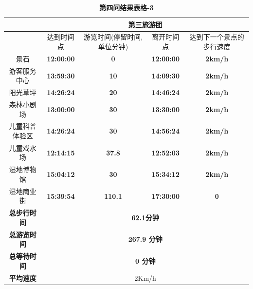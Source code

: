 \documentclass[hyperref,UTF8]{article}
\begin{document}
{\begin{table}[htbp]
  \centering
  \caption{\textbf{第四问结果表格-3}}
    \begin{tabular}{|c|c|c|c|c|}
    \hline
       & \multicolumn{4}{c|}{\textbf{第三旅游团}} \bigstrut\\
    \hline
       & \multicolumn{1}{p{4.055em}|}{达到时间点} & \multicolumn{1}{p{4.055em}|}{游览时间(停留时间,单位分钟)} & \multicolumn{1}{p{4.055em}|}{离开时间点} & \multicolumn{1}{p{4.055em}|}{达到下一个景点的步行速度} \bigstrut\\
    \hline
    \multicolumn{1}{|p{4.055em}|}{景石} & \textbf{12:00:00} & \textbf{0} & \textbf{12:00:00} & \multicolumn{1}{p{4.055em}|}{\textbf{2km/h}} \bigstrut\\
    \hline
    \multicolumn{1}{|p{4.055em}|}{游客服务中心} & \textbf{13:59:30} & \textbf{10} & \textbf{14:09:30} & \multicolumn{1}{p{4.055em}|}{\textbf{2km/h}} \bigstrut\\
    \hline
    \multicolumn{1}{|p{4.055em}|}{阳光草坪} & \textbf{14:26:24} & \textbf{20} & \textbf{14:46:24} & \multicolumn{1}{p{4.055em}|}{\textbf{2km/h}} \bigstrut\\
    \hline
    \multicolumn{1}{|p{4.055em}|}{森林小剧场} & \textbf{13:00:00} & \textbf{30} & \textbf{13:30:00} & \multicolumn{1}{p{4.055em}|}{\textbf{2km/h}} \bigstrut\\
    \hline
    \multicolumn{1}{|p{4.055em}|}{儿童科普体验区} & \textbf{14:26:24} & \textbf{30} & \textbf{14:56:24} & \multicolumn{1}{p{4.055em}|}{\textbf{2km/h}} \bigstrut\\
    \hline
    \multicolumn{1}{|p{4.055em}|}{儿童戏水场} & \textbf{12:14:15} & \textbf{37.8} & \textbf{12:52:03} & \multicolumn{1}{p{4.055em}|}{\textbf{2km/h}} \bigstrut\\
    \hline
    \multicolumn{1}{|p{4.055em}|}{湿地博物馆} & \textbf{15:04:12} & \textbf{30} & \textbf{15:34:12} & \multicolumn{1}{p{4.055em}|}{\textbf{2km/h}} \bigstrut\\
    \hline
    \multicolumn{1}{|p{4.055em}|}{湿地商业街} & \textbf{15:39:54} & \textbf{110.1} & \textbf{17:30:00} & \textbf{0} \bigstrut\\
    \hline
    \multicolumn{1}{|p{4.055em}|}{\textbf{总步行时间}} & \multicolumn{4}{c|}{\textbf{62.1分钟}} \bigstrut\\
    \hline
    \multicolumn{1}{|p{4.055em}|}{\textbf{总游览时间}} & \multicolumn{4}{c|}{\textbf{267.9 分钟}} \bigstrut\\
    \hline
    \multicolumn{1}{|p{4.055em}|}{\textbf{总等待时间}} & \multicolumn{4}{c|}{\textbf{0 分钟}} \bigstrut\\
    \hline
    \multicolumn{1}{|c|}{\multirow{2}[2]{*}{\textbf{平均速度}}} & \multicolumn{4}{c|}{\multirow{2}[2]{*}{ 2Km/h}} \bigstrut[t]\\
       & \multicolumn{4}{c|}{} \bigstrut[b]\\
    \hline
    \end{tabular}%
  \label{tab:addlabel+3}%
\end{table}%

}
\end{document}
